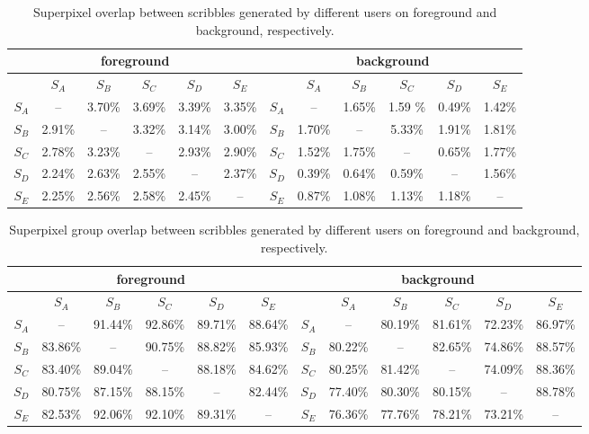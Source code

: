 \documentclass[runningheads,a4paper]{llncs}
\begin{document}
\begin{table}[!h]
\centering
\vspace{-0.2cm}
\caption{Superpixel overlap between scribbles generated by different users on foreground and background, respectively.}
\begin{tabular}{c|c|c|c|c|c||c|c|c|c|c|c}
\hline
\multicolumn{6}{c||}{foreground} &\multicolumn{6}{c}{background}\\
\hline
& $S_{A}$ & $S_{B}$ & $S_{C}$ & $S_{D}$ & $S_{E}$ && $S_{A}$ & $S_{B}$ & $S_{C}$ & $S_{D}$ & $S_{E}$ \\
\hline
$S_{A}$ & -- & 3.70\% & 3.69\% & 3.39\% & 3.35\% & $S_{A}$ & -- & 1.65\% & 1.59	\% & 0.49\% & 1.42\% \\
\hline
$S_{B}$ & 2.91\% & -- & 3.32\% & 3.14\% & 3.00\% & $S_{B}$ & 1.70\% & -- & 5.33\% & 1.91\% & 1.81\% \\
\hline
$S_{C}$ & 2.78\% & 3.23\% & -- & 2.93\% & 2.90\% & $S_{C}$ & 1.52\% & 1.75\% & -- & 0.65\% & 1.77\% \\
\hline
$S_{D}$ & 2.24\% & 2.63\% & 2.55\% & -- & 2.37\% & $S_{D}$ & 0.39\% & 0.64\% & 0.59\% & -- & 1.56\% \\
\hline
$S_{E}$ & 2.25\% & 2.56\% & 2.58\% & 2.45\% &--  & $S_{E}$ & 0.87\% & 1.08\% & 1.13\% & 1.18\% & --  \\
\hline
\end{tabular}
\label{tab:sp-overlap}
\end{table}

\begin{table}[!h]
\centering
\vspace{-0.2cm}
\caption{Superpixel group overlap between scribbles generated by different users on foreground and background, respectively.}
\begin{tabular}{c|c|c|c|c|c||c|c|c|c|c|c}
\hline
\multicolumn{6}{c||}{foreground} &\multicolumn{6}{c}{background}\\
\hline
& $S_{A}$ & $S_{B}$ & $S_{C}$ & $S_{D}$ & $S_{E}$ && $S_{A}$ & $S_{B}$ & $S_{C}$ & $S_{D}$ & $S_{E}$ \\
\hline
$S_{A}$ & -- & 91.44\% & 92.86\% & 89.71\% & 88.64\% & $S_{A}$ & -- & 80.19\% & 81.61\% & 72.23\% & 86.97\% \\
\hline
$S_{B}$ & 83.86\% & -- & 90.75\% & 88.82\% & 85.93\% & $S_{B}$ & 80.22\% & -- & 82.65\%& 74.86\% & 88.57\% \\
\hline
$S_{C}$ & 83.40\% & 89.04\% & -- & 88.18\% & 84.62\% & $S_{C}$ & 80.25\% & 81.42\% & -- & 74.09\% & 88.36\% \\
\hline
$S_{D}$ & 80.75\% & 87.15\% & 88.15\% & -- & 82.44\% & $S_{D}$ & 77.40\% & 80.30\% & 80.15\% & -- & 88.78\% \\
\hline
$S_{E}$ & 82.53\% & 92.06\% & 92.10\% & 89.31\%& --  & $S_{E}$ & 76.36\% & 77.76\% & 78.21\% & 73.21\% & --  \\
\hline
\end{tabular}
\label{tab:spg-overlap}
\end{table}
\end{document}
